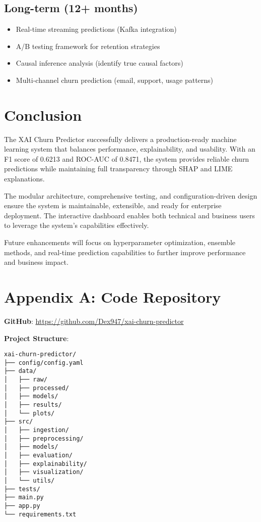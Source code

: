 \documentclass[11pt,a4paper]{article}
\begin{document}
\subsection{Long-term (12+ months)}
\begin{itemize}
    \item Real-time streaming predictions (Kafka integration)
    \item A/B testing framework for retention strategies
    \item Causal inference analysis (identify true causal factors)
    \item Multi-channel churn prediction (email, support, usage patterns)
\end{itemize}

\section{Conclusion}

The XAI Churn Predictor successfully delivers a production-ready machine learning system that balances performance, explainability, and usability. With an F1 score of 0.6213 and ROC-AUC of 0.8471, the system provides reliable churn predictions while maintaining full transparency through SHAP and LIME explanations.

The modular architecture, comprehensive testing, and configuration-driven design ensure the system is maintainable, extensible, and ready for enterprise deployment. The interactive dashboard enables both technical and business users to leverage the system's capabilities effectively.

Future enhancements will focus on hyperparameter optimization, ensemble methods, and real-time prediction capabilities to further improve performance and business impact.

\section*{Appendix A: Code Repository}

\textbf{GitHub}: \url{https://github.com/Dex947/xai-churn-predictor}

\textbf{Project Structure}:
\begin{verbatim}
xai-churn-predictor/
├── config/config.yaml
├── data/
│   ├── raw/
│   ├── processed/
│   ├── models/
│   ├── results/
│   └── plots/
├── src/
│   ├── ingestion/
│   ├── preprocessing/
│   ├── models/
│   ├── evaluation/
│   ├── explainability/
│   ├── visualization/
│   └── utils/
├── tests/
├── main.py
├── app.py
└── requirements.txt
\end{verbatim}
\end{document}
